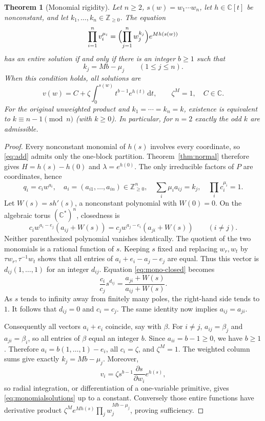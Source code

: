 \documentclass[11pt]{article}
\numberwithin{equation}{section}
\newtheorem{theorem}{Theorem}[section]
\theoremstyle{definition}\newtheorem{definition}[theorem]{Definition}
\theoremstyle{remark}\newtheorem{remark}[theorem]{Remark}
\newcommand{\C}{\mathbb C}
\newcommand{\NN}{\mathbb Z_{\geq0}}
\newcommand{\dd}{\,\mathrm d}
\begin{document}
\begin{theorem}[Monomial rigidity]\label{thm:monomial}
Let $n\geq2$, $s(w)=w_1\cdots w_n$, let $h\in\C[t]$ be nonconstant,
and let $k_1,\ldots,k_n\in\NN$. The equation
\begin{equation}\label{eq:monomial}
 \prod_{i=1}^n v_i^{\mu_i}
 =\Bigl(\prod_{j=1}^n w_j^{k_j}\Bigr)e^{M h(s(w))}
\end{equation}
has an entire solution if and only if there is an integer $b\geq1$ such
that
\begin{equation}\label{eq:arith}
 k_j=Mb-\mu_j\qquad(1\leq j\leq n).
\end{equation}
When this condition holds, all solutions are
\begin{equation}\label{eq:monomialsolutions}
 v(w)=C+\zeta\int_0^{s(w)}t^{b-1}e^{h(t)}\dd t,
 \qquad \zeta^M=1,\quad C\in\C.
\end{equation}
For the original unweighted product and $k_1=\cdots=k_n=k$, existence
is equivalent to $k\equiv n-1\pmod n$ (with $k\geq0$). In particular,
for $n=2$ exactly the odd $k$ are admissible.
\end{theorem}
\begin{proof}
Every nonconstant monomial of $h(s)$ involves every coordinate, so
\eqref{eq:add} admits only the one-block partition. Theorem~\ref{thm:normal}
therefore gives $H=h(s)-h(0)$ and $\lambda=e^{h(0)}$. The only irreducible
factors of $P$ are coordinates, hence
\[
 q_i=c_i w^{a_i},\quad a_i=(a_{i1},\ldots,a_{in})\in\NN^n,
 \quad\sum_i\mu_i a_{ij}=k_j,
 \quad\prod_i c_i^{\mu_i}=1.
\]
Let $W(s)=s h'(s)$, a nonconstant polynomial with $W(0)=0$.
On the algebraic torus $(\C^*)^n$, closedness is
\begin{equation}\label{eq:mono-closed}
 c_i w^{a_i-e_j}(a_{ij}+W(s))
 =c_j w^{a_j-e_i}(a_{ji}+W(s))\qquad(i\ne j).
\end{equation}
Neither parenthesized polynomial vanishes identically.
The quotient of the two monomials is a rational function of $s$.
Keeping $s$ fixed and replacing $w_r,w_t$ by $\tau w_r,\tau^{-1}w_t$
shows that all entries of $a_i+e_i-a_j-e_j$ are equal. Thus this vector
is $d_{ij}(1,\ldots,1)$ for an integer $d_{ij}$. Equation
\eqref{eq:mono-closed} becomes
\[
 \frac{c_i}{c_j}s^{d_{ij}}
 =\frac{a_{ji}+W(s)}{a_{ij}+W(s)}.
\]
As $s$ tends to infinity away from finitely many poles, the right-hand
side tends to $1$. It follows that $d_{ij}=0$ and $c_i=c_j$.
The same identity now implies $a_{ij}=a_{ji}$.

Consequently all vectors $a_i+e_i$ coincide, say with $\beta$.
For $i\ne j$, $a_{ij}=\beta_j$ and $a_{ji}=\beta_i$, so all entries
of $\beta$ equal an integer $b$. Since $a_{ii}=b-1\geq0$, we have
$b\geq1$. Therefore $a_i=b(1,\ldots,1)-e_i$, all $c_i=\zeta$, and
$\zeta^M=1$. The weighted column sums give exactly
$k_j=Mb-\mu_j$. Moreover,
\[
 v_i=\zeta s^{b-1}\frac{\partial s}{\partial w_i}e^{h(s)},
\]
so radial integration, or differentiation of a one-variable primitive,
gives \eqref{eq:monomialsolutions} up to a constant.
Conversely those entire functions have derivative product
$\zeta^M e^{Mh(s)}\prod_jw_j^{Mb-\mu_j}$, proving sufficiency.
\end{proof}
\end{document}
